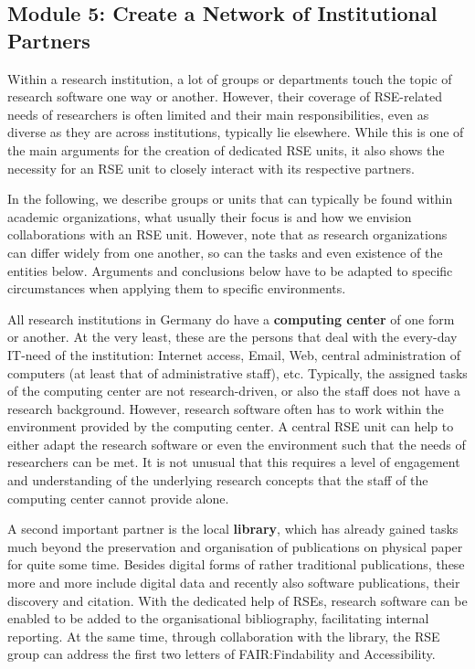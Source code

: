 \documentclass[a4paper]{article}
\begin{document}
\subsection{Module 5: Create a Network of Institutional Partners}%
\label{sec:partners}

Within a research institution, a lot of groups or departments touch the topic of research software one way or another.
However, their coverage of RSE-related needs of researchers is often limited and their main responsibilities, even as diverse as they are across institutions, typically lie elsewhere.
While this is one of the main arguments for the creation of dedicated RSE units, it also shows the necessity for an RSE unit to closely interact with its respective partners.

In the following, we describe groups or units that can typically be found within academic organizations,
what usually their focus is and how we envision collaborations with an RSE unit.
However, note that as research organizations can differ widely from one another, so can the tasks and even existence of the entities below.
Arguments and conclusions below have to be adapted to specific circumstances when applying them to specific environments.

All research institutions in Germany do have a \textbf{computing center} of one form or another.
At the very least, these are the persons that deal with the every-day IT-need of the institution:
Internet access, Email, Web, central administration of computers (at least that of administrative staff), etc.
Typically, the assigned tasks of the computing center are not research-driven, or also the staff does not have a research background.
However, research software often has to work within the environment provided by the computing center.
A central RSE unit can help to either adapt the research software or even the environment such that the needs of researchers can be met.
It is not unusual that this requires a level of engagement and understanding of the underlying research concepts that the staff of the computing center cannot provide alone.

A second important partner is the local \textbf{library}, which has already gained tasks much beyond the preservation and organisation of publications on physical paper for quite some time.
Besides digital forms of rather traditional publications, these more and more include digital data and recently also software publications, their discovery and citation.
With the dedicated help of RSEs, research software can be enabled to be added to the organisational bibliography, facilitating internal reporting.
At the same time, through collaboration with the library, the RSE group can address the first two letters of FAIR:\@ Findability and Accessibility.
\end{document}
